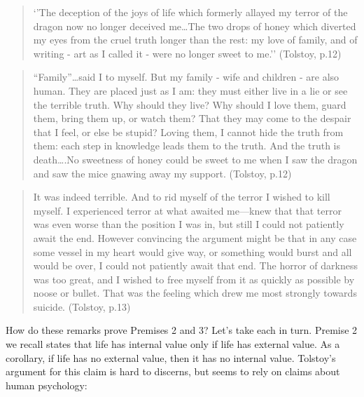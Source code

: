 \documentclass[9pt]{article}
\begin{document}
\begin{quote}
`'The deception of the joys of life which formerly allayed my terror of
the dragon now no longer deceived me\ldots{}The two drops of honey which
diverted my eyes from the cruel truth longer than the rest: my love of
family, and of writing - art as I called it - were no longer sweet to
me.'' (Tolstoy, p.12)
\end{quote}

\begin{quote}
``Family''\ldots{}said I to myself. But my family - wife and children -
are also human. They are placed just as I am: they must either live in a
lie or see the terrible truth. Why should they live? Why should I love
them, guard them, bring them up, or watch them? That they may come to
the despair that I feel, or else be stupid? Loving them, I cannot hide
the truth from them: each step in knowledge leads them to the truth. And
the truth is death\ldots{}.No sweetness of honey could be sweet to me
when I saw the dragon and saw the mice gnawing away my support.
(Tolstoy, p.12)
\end{quote}

\begin{quote}
It was indeed terrible. And to rid myself of the terror I wished to kill
myself. I experienced terror at what awaited me---knew that that terror
was even worse than the position I was in, but still I could not
patiently await the end. However convincing the argument might be that
in any case some vessel in my heart would give way, or something would
burst and all would be over, I could not patiently await that end. The
horror of darkness was too great, and I wished to free myself from it as
quickly as possible by noose or bullet. That was the feeling which drew
me most strongly towards suicide. (Tolstoy, p.13)
\end{quote}

How do these remarks prove Premises 2 and 3? Let's take each in turn.
Premise 2 we recall states that life has internal value only if life has
external value. As a corollary, if life has no external value, then it
has no internal value. Tolstoy's argument for this claim is hard to
discerns, but seems to rely on claims about human psychology:
\end{document}
